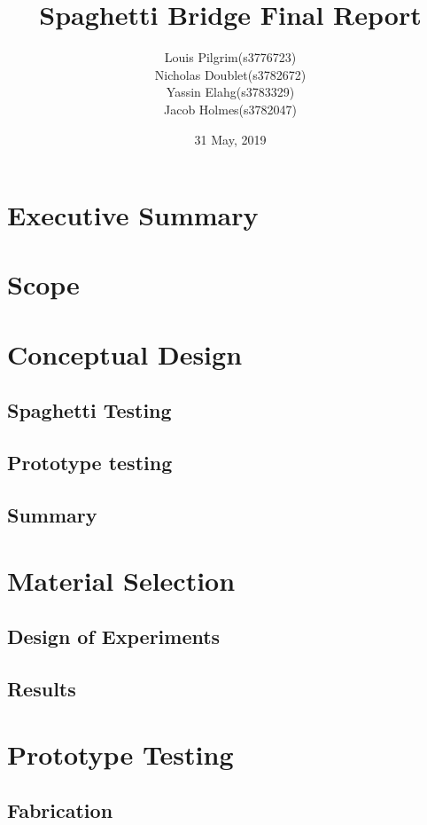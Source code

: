\documentclass{article}
\begin{document}
\title{Spaghetti Bridge Final Report}
\author{Louis Pilgrim(s3776723)\\Nicholas Doublet(s3782672)\\Yassin Elahg(s3783329)\\Jacob Holmes(s3782047)}
\date{31 May, 2019}
\maketitle
\newpage

\section{Executive Summary}

\newpage
\tableofcontents
\newpage

\section{Scope}
\section{Conceptual Design}
\subsection{Spaghetti Testing}
\subsection{Prototype testing}
\subsection{Summary}

\section{Material Selection}
\subsection{Design of Experiments}
\subsection{Results}

\section{Prototype Testing}
\subsection{Fabrication}
\end{document}
